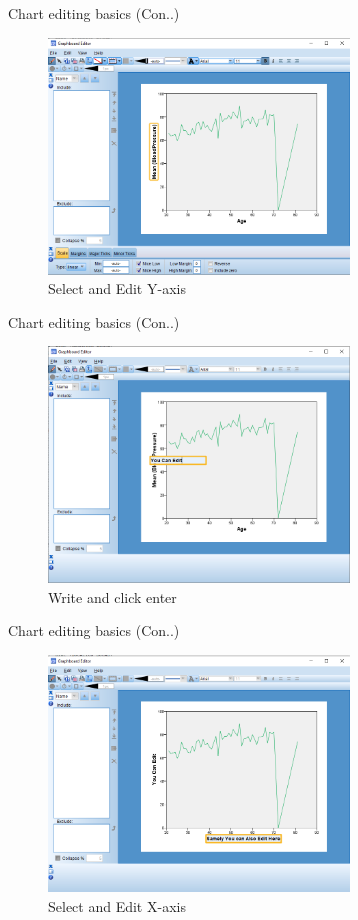 \begin{frame}[t]{Chart editing basics (Con..)}
	\begin{figure}
		\centering
		\includegraphics[width=8cm]{img/edit_chart-4}
		\caption{Select and Edit Y-axis}
	\end{figure}
\end{frame}
\begin{frame}[t]{Chart editing basics (Con..)}
	\begin{figure}
		\centering
		\includegraphics[width=8cm]{img/edit_chart-5}
		\caption{Write and click enter}
	\end{figure}
\end{frame}
\begin{frame}[t]{Chart editing basics (Con..)}
	\begin{figure}
		\centering
		\includegraphics[width=8cm]{img/edit_chart-6}
		\caption{Select and Edit X-axis}
	\end{figure}
\end{frame}
